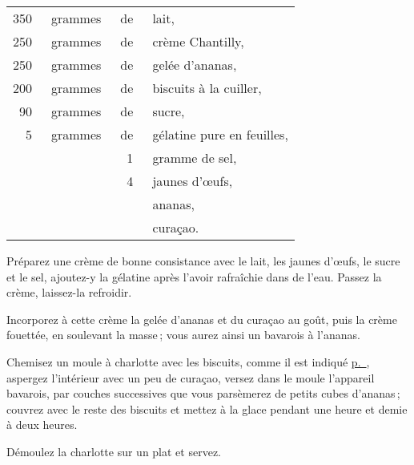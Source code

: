 \footnotesize
\begin{longtable}{rrrp{16em}}
    350 & grammes & de & lait,                                                                            \\
    250 & grammes & de & crème Chantilly,                                                                 \\
    250 & grammes & de & gelée d'ananas,                                                                  \\
    200 & grammes & de & biscuits à la cuiller,                                                           \\
     90 & grammes & de & sucre,                                                                           \\
      5 & grammes & de & gélatine pure en feuilles,                                                       \\
        &         &  1 & gramme de sel,                                                                   \\
        &         &  4 & jaunes d'œufs,                                                                   \\
        &         &    & ananas,                                                                          \\
        &         &    & curaçao.                                                                         \\
\end{longtable}
\normalsize

Préparez une crème de bonne consistance avec le lait, les jaunes d'œufs, le
sucre et le sel, ajoutez-y la gélatine après l'avoir rafraîchie dans de l'eau.
Passez la crème, laissez-la refroidir.

Incorporez à cette crème la gelée d'ananas et du curaçao au goût, puis la crème
fouettée, en soulevant la masse ; vous aurez ainsi un bavarois à l'ananas.

Chemisez un moule à charlotte avec les biscuits, comme il est indiqué
\hyperlink{p0865}{p. \pageref{pg0865}}, aspergez l'intérieur avec un peu de
curaçao, versez dans le moule l'appareil bavarois, par couches successives que
vous parsèmerez de petits cubes d’ananas ; couvrez avec le reste des biscuits
et mettez à la glace pendant une heure et demie à deux heures.

Démoulez la charlotte sur un plat et servez.

